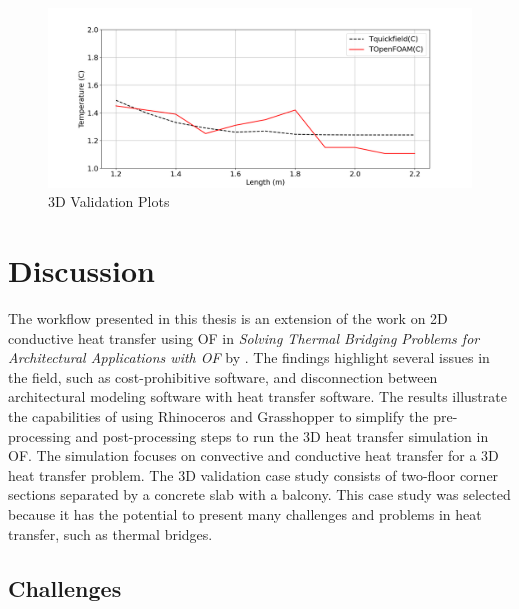 \begin{figure}[htb] 
\centering
\includegraphics[width=1\columnwidth]{Figures/valpl2.png}
\hspace{0.7cm}
\caption{3D Validation Plots}
\label{fig:validation-plots}
\end{figure}





\afterpage{\clearpage}
\section{Discussion}


The workflow presented in this thesis is an extension of the work on 2D conductive heat transfer using \gls{OF} in \textit{Solving Thermal Bridging Problems for Architectural Applications with  \gls{OF}} by \cite{kastner2020solving}. 
The findings highlight several issues in the field, such as cost-prohibitive software, and disconnection between architectural modeling software with heat transfer software. 
The results illustrate the capabilities of using Rhinoceros and Grasshopper to simplify the pre-processing and post-processing steps to run the 3D heat transfer simulation in \gls{OF}. The simulation focuses on convective and conductive heat transfer for a 3D heat transfer problem. The 3D validation case study consists of two-floor corner sections separated by a concrete slab with a balcony. This case study was selected because it has the potential to present many challenges and problems in heat transfer, such as thermal bridges.


\subsection{Challenges}
